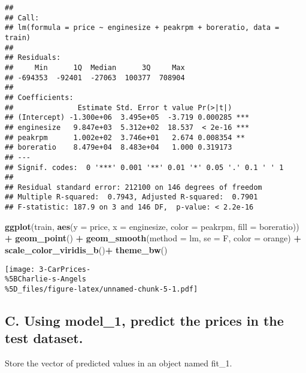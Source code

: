 \documentclass[
]{article}
\newenvironment{Shaded}{\begin{snugshade}}{\end{snugshade}}
\newcommand{\AttributeTok}[1]{\textcolor[rgb]{0.13,0.29,0.53}{#1}}
\newcommand{\FunctionTok}[1]{\textcolor[rgb]{0.13,0.29,0.53}{\textbf{#1}}}
\newcommand{\NormalTok}[1]{#1}
\newcommand{\SpecialCharTok}[1]{\textcolor[rgb]{0.81,0.36,0.00}{\textbf{#1}}}
\newcommand{\StringTok}[1]{\textcolor[rgb]{0.31,0.60,0.02}{#1}}
\begin{document}
\begin{verbatim}
## 
## Call:
## lm(formula = price ~ enginesize + peakrpm + boreratio, data = train)
## 
## Residuals:
##     Min      1Q  Median      3Q     Max 
## -694353  -92401  -27063  100377  708904 
## 
## Coefficients:
##               Estimate Std. Error t value Pr(>|t|)    
## (Intercept) -1.300e+06  3.495e+05  -3.719 0.000285 ***
## enginesize   9.847e+03  5.312e+02  18.537  < 2e-16 ***
## peakrpm      1.002e+02  3.746e+01   2.674 0.008354 ** 
## boreratio    8.479e+04  8.483e+04   1.000 0.319173    
## ---
## Signif. codes:  0 '***' 0.001 '**' 0.01 '*' 0.05 '.' 0.1 ' ' 1
## 
## Residual standard error: 212100 on 146 degrees of freedom
## Multiple R-squared:  0.7943, Adjusted R-squared:  0.7901 
## F-statistic: 187.9 on 3 and 146 DF,  p-value: < 2.2e-16
\end{verbatim}

\begin{Shaded}
\begin{Highlighting}[]
\FunctionTok{ggplot}\NormalTok{(train, }\FunctionTok{aes}\NormalTok{(}\AttributeTok{y =}\NormalTok{ price, }\AttributeTok{x =}\NormalTok{ enginesize, }\AttributeTok{color =}\NormalTok{ peakrpm, }\AttributeTok{fill =}\NormalTok{ boreratio)) }\SpecialCharTok{+}
  \FunctionTok{geom\_point}\NormalTok{() }\SpecialCharTok{+}
  \FunctionTok{geom\_smooth}\NormalTok{(}\AttributeTok{method =}\NormalTok{ lm, }\AttributeTok{se =}\NormalTok{ F, }\AttributeTok{color =} \StringTok{\textquotesingle{}orange\textquotesingle{}}\NormalTok{) }\SpecialCharTok{+}
  \FunctionTok{scale\_color\_viridis\_b}\NormalTok{()}\SpecialCharTok{+}
  \FunctionTok{theme\_bw}\NormalTok{()}
\end{Highlighting}
\end{Shaded}

\texttt{[image: 3-CarPrices-\\\%5BCharlie-s-Angels\\\%5D\_files/figure-latex/unnamed-chunk-5-1.pdf]}

\subsection{C. Using model\_1, predict the prices in the test
dataset.}\label{c.-using-model_1-predict-the-prices-in-the-test-dataset.}

Store the vector of predicted values in an object named fit\_1.
\end{document}
